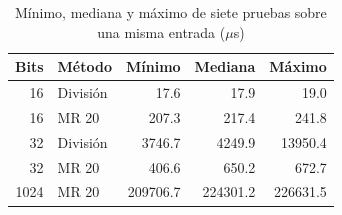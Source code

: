 \begin{table}[H]\centering\small
\caption{Mínimo, mediana y máximo de siete pruebas sobre una misma entrada ($\mu$s)}
\label{tab:dispersion}
\begin{tabular}{rlrrr}\toprule
Bits & Método & Mínimo & Mediana & Máximo \\
\midrule
16 & División & 17.6 & 17.9 & 19.0 \\
16 & MR 20 & 207.3 & 217.4 & 241.8 \\
32 & División & 3746.7 & 4249.9 & 13950.4 \\
32 & MR 20 & 406.6 & 650.2 & 672.7 \\
1024 & MR 20 & 209706.7 & 224301.2 & 226631.5 \\
\bottomrule\end{tabular}\end{table}

